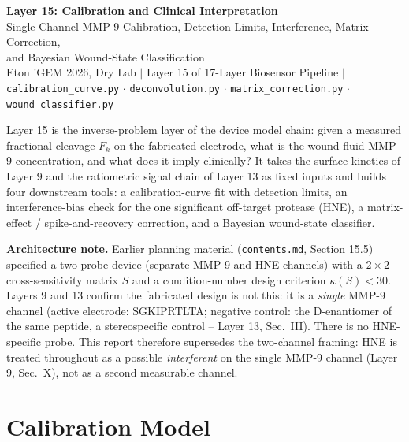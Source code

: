 \documentclass[11pt]{article}
\numberwithin{equation}{section}
\newcommand{\code}[1]{\texttt{#1}}
\begin{document}
\begin{center}
{\LARGE \bfseries Layer 15: Calibration and Clinical Interpretation}\\[4pt]
{\large Single-Channel MMP-9 Calibration, Detection Limits, Interference, Matrix Correction,\\ and Bayesian Wound-State Classification}\\[6pt]
{\small \textcolor[gray]{0.4}{Eton iGEM 2026, Dry Lab \quad $|$ \quad Layer 15 of 17-Layer Biosensor Pipeline \quad $|$ \quad \texttt{calibration\_curve.py} $\cdot$ \texttt{deconvolution.py} $\cdot$ \texttt{matrix\_correction.py} $\cdot$ \texttt{wound\_classifier.py}}}
\end{center}
\vspace{4pt}

\noindent Layer 15 is the inverse-problem layer of the device model chain: given a measured fractional cleavage
$F_k$ on the fabricated electrode, what is the wound-fluid MMP-9 concentration, and what does it imply
clinically? It takes the surface kinetics of Layer 9 and the ratiometric signal chain of Layer 13 as fixed
inputs and builds four downstream tools: a calibration-curve fit with detection limits, an interference-bias
check for the one significant off-target protease (HNE), a matrix-effect / spike-and-recovery correction, and
a Bayesian wound-state classifier.

\noindent\textbf{Architecture note.} Earlier planning material (\code{contents.md}, Section 15.5) specified a
two-probe device (separate MMP-9 and HNE channels) with a $2\times2$ cross-sensitivity matrix $S$ and a
condition-number design criterion $\kappa(S)<30$. Layers 9 and 13 confirm the fabricated design is not this:
it is a \emph{single} MMP-9 channel (active electrode: SGKIPRTLTA; negative control: the D-enantiomer of the
same peptide, a stereospecific control -- Layer 13, Sec.\ III). There is no HNE-specific probe. This report
therefore supersedes the two-channel framing: HNE is treated throughout as a possible \emph{interferent} on
the single MMP-9 channel (Layer 9, Sec.\ X), not as a second measurable channel.

\section{Calibration Model}
\end{document}
